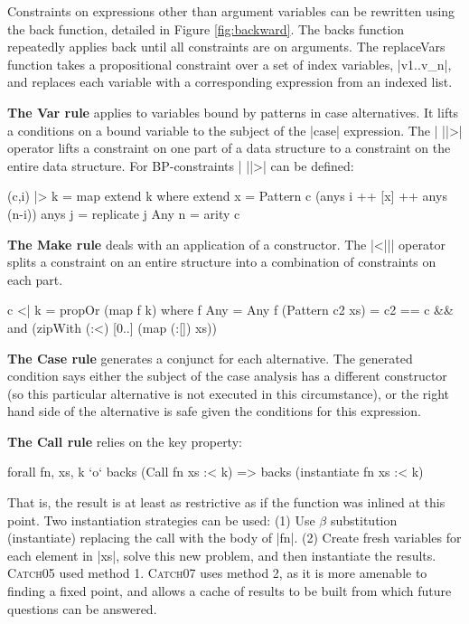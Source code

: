\documentclass[preprint]{sigplanconf}
\newcommand{\C}[1]{\textsf{#1}}
\newcommand{\catch}{\textsc{Catch}}
\newcommand{\para}[1]{\vspace{2mm}\noindent\textbf{#1}}
\newenvironment{discuss}
    {\noindent\hspace{-1.5mm}\vline\hspace{1mm}\vline\hspace{1mm}\begin{minipage}[h]{\linewidth}}
    {\end{minipage}}
\begin{document}
Constraints on expressions other than argument variables can be rewritten using the \C{back} function, detailed in Figure \ref{fig:backward}. The \C{backs} function repeatedly applies \C{back} until all constraints are on arguments. The \C{replaceVars} function takes a propositional constraint over a set of index variables, |v1..v_n|, and replaces each variable with a corresponding expression from an indexed list.

\para{The \C{Var} rule} applies to variables bound by patterns in case alternatives. It lifts a conditions on a bound variable to the subject of the |case| expression. The | ||>| operator lifts a constraint on one part of a data structure to a constraint on the entire data structure. For BP-constraints | ||>| can be defined:

\begin{code}
(c,i) |> k = map extend k
    where
    extend x = Pattern c (anys i ++ [x] ++ anys (n-i))
    anys j = replicate j Any
    n = arity c
\end{code}

\para{The \C{Make} rule} deals with an application of a constructor. The |<||| operator splits a constraint on an entire structure into a combination of constraints on each part.

\begin{code}
c <| k = propOr (map f k)
    where
    f Any = Any
    f (Pattern c2 xs) = c2 == c &&
        and (zipWith (:<) [0..] (map (:[]) xs))
\end{code}

\begin{discuss}
\para{The \C{Case} rule} generates a conjunct for each alternative. The generated condition says either the subject of the case analysis has a different constructor (so this particular alternative is not executed in this circumstance), or the right hand side of the alternative is safe given the conditions for this expression.
\end{discuss}

\para{The \C{Call} rule} relies on the key property:

\begin{code}
forall fn, xs, k `o`  backs (Call fn xs :< k) =>
                      backs (instantiate fn xs :< k)
\end{code}

That is, the result is at least as restrictive as if the function was inlined at this point. Two instantiation strategies can be used: (1) Use $\beta$ substitution (\C{instantiate}) replacing the call with the body of |fn|. (2) Create fresh variables for each element in |xs|, solve this new problem, and then instantiate the results. \catch05 used method 1. \catch07 uses method 2, as it is more amenable to finding a fixed point, and allows a cache of results to be built from which future questions can be answered.
\end{document}
